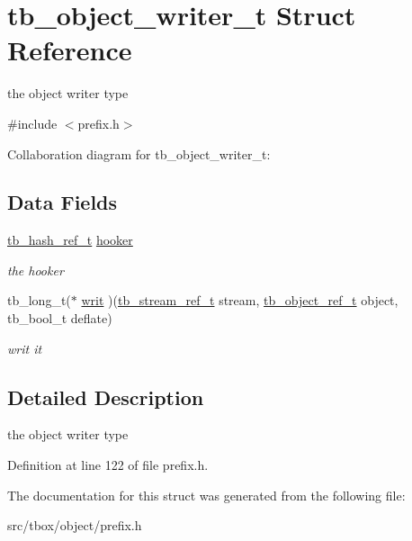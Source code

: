 \hypertarget{structtb__object__writer__t}{\section{tb\-\_\-object\-\_\-writer\-\_\-t Struct Reference}
\label{structtb__object__writer__t}
}


the object writer type  




{\ttfamily \#include $<$prefix.\-h$>$}



Collaboration diagram for tb\-\_\-object\-\_\-writer\-\_\-t\-:
\subsection*{Data Fields}
\begin{DoxyCompactItemize}
\item 
\hypertarget{structtb__object__writer__t_a872c3198c1e39cd09152ee27d4612e58}{\hyperlink{structtb__iterator__t}{tb\-\_\-hash\-\_\-ref\-\_\-t} \hyperlink{structtb__object__writer__t_a872c3198c1e39cd09152ee27d4612e58}{hooker}}\label{structtb__object__writer__t_a872c3198c1e39cd09152ee27d4612e58}

\begin{DoxyCompactList}\small\item\em the hooker \end{DoxyCompactList}\item 
\hypertarget{structtb__object__writer__t_a00197acc5ccd287c5022f7ab916cb831}{tb\-\_\-long\-\_\-t($\ast$ \hyperlink{structtb__object__writer__t_a00197acc5ccd287c5022f7ab916cb831}{writ} )(\hyperlink{structtb__stream__ref__t}{tb\-\_\-stream\-\_\-ref\-\_\-t} stream, \hyperlink{structtb__object__t}{tb\-\_\-object\-\_\-ref\-\_\-t} object, tb\-\_\-bool\-\_\-t deflate)}\label{structtb__object__writer__t_a00197acc5ccd287c5022f7ab916cb831}

\begin{DoxyCompactList}\small\item\em writ it \end{DoxyCompactList}\end{DoxyCompactItemize}


\subsection{Detailed Description}
the object writer type 

Definition at line 122 of file prefix.\-h.



The documentation for this struct was generated from the following file\-:\begin{DoxyCompactItemize}
\item 
src/tbox/object/prefix.\-h\end{DoxyCompactItemize}
